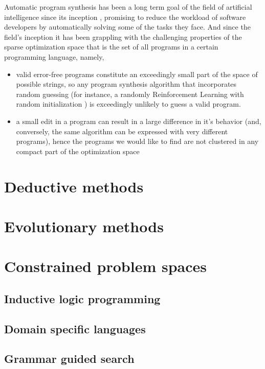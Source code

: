 Automatic program synthesis has been a long term goal of the field of artificial intelligence since its inception \cite{mannaAutomaticProgramSynthesis1971}, promising to reduce the workload of software developers by automatically solving some of the tasks they face.
And since the field's inception it has been grappling with the challenging properties of the sparse optimization space that is the set of all programs in a certain programming language, namely, 
\begin{itemize}
    \item valid error-free programs constitute an exceedingly small part of the space of possible strings, so any program synthesis algorithm that incorporates random guessing (for instance, a randomly Reinforcement Learning with random initialization \cite{suttonReinforcementLearningSecond2018}) is exceedingly unlikely to guess a valid program.
    \item a small edit in a program can result in a large difference in it's behavior (and, conversely, the same algorithm can be expressed with very different programs), hence the programs we would like to find are not clustered in any compact part of the optimization space
\end{itemize}

\section{Deductive methods}

\newpage
\section{Evolutionary methods}

\newpage
\section{Constrained problem spaces}

\subsection{Inductive logic programming}

\subsection{Domain specific languages}

\subsection{Grammar guided search}

